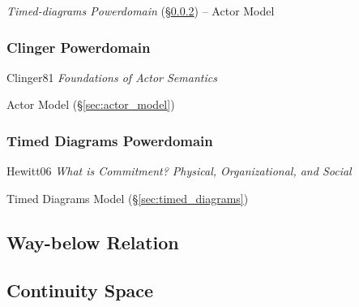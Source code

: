 \emph{Timed-diagrams Powerdomain}
(\S\ref{sec:timed_diagrams_powerdomain}) -- Actor Model



\subsubsection{Clinger Powerdomain}\label{sec:clinger_powerdomain}

Clinger81 \emph{Foundations of Actor Semantics}

\fist Actor Model (\S\ref{sec:actor_model})



\subsubsection{Timed Diagrams Powerdomain}
\label{sec:timed_diagrams_powerdomain}

Hewitt06 \emph{What is Commitment? Physical, Organizational, and
  Social}

\fist Timed Diagrams Model (\S\ref{sec:timed_diagrams})



\subsection{Way-below Relation}\label{sec:waybelow_relation}

\subsection{Continuity Space}\label{sec:continuity_space}
